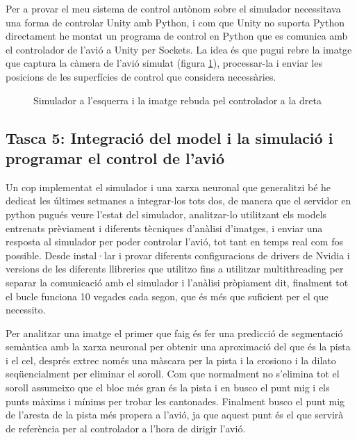 \documentclass[10pt,a4paper,twocolumn,twoside]{article}
\begin{document}
Per a provar el meu sistema de control autònom sobre el simulador necessitava una forma de controlar Unity amb Python, i com que Unity no suporta
Python directament he montat un programa de control en Python que es comunica amb el controlador de l'avió a Unity per Sockets. La idea és que
pugui rebre la imatge que captura la càmera de l'avió simulat (figura \ref{fig-simulador-controlador}), processar-la i enviar les posicions de les superfícies de control que considera
necessàries.

\begin{figure}[h]
\centering
{}
    \caption{Simulador a l'esquerra i la imatge rebuda pel controlador a la dreta}
    \label{fig-simulador-controlador}
\end{figure}

\subsection{Tasca 5: Integració del model i la simulació i programar el control de l'avió}
Un cop implementat el simulador i una xarxa neuronal que generalitzi bé he dedicat les últimes setmanes a integrar-los tots
dos, de manera que el servidor en python pugués veure l'estat del simulador, analitzar-lo utilitzant els models entrenats
prèviament i diferents tècniques d'anàlisi d'imatges, i enviar una resposta al simulador per poder controlar l'avió, tot
tant en temps real com fos possible. Desde instal·lar i provar diferents configuracions de drivers de Nvidia i versions
de les diferents llibreries que utilitzo fins a utilitzar multithreading per separar la comunicació amb el simulador i 
l'anàlisi pròpiament dit, finalment tot el bucle funciona 10 vegades cada segon, que és més que suficient per el que necessito.

Per analitzar una imatge el primer que faig és fer una predicció de segmentació semàntica amb la xarxa neuronal per obtenir 
una aproximació del que és la pista i el cel, després extrec només una màscara per la pista i la erosiono i la dilato
seqüencialment per eliminar el soroll. Com que normalment no s'elimina tot el soroll assumeixo que el bloc més gran és la
pista i en busco el punt mig i els punts màxims i mínims per trobar les cantonades. Finalment busco el punt mig de l'aresta
de la pista més propera a l'avió, ja que aquest punt és el que servirà de referència per al controlador a l'hora de dirigir
l'avió.
\end{document}
